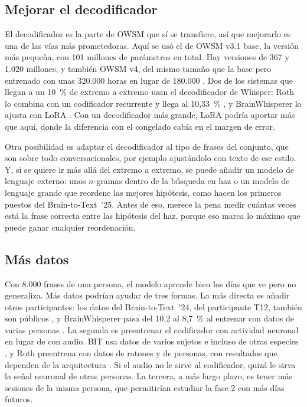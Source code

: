 \subsection{Mejorar el decodificador}

El decodificador es la parte de OWSM que sí se transfiere, así que mejorarlo es una de las vías más prometedoras. Aquí se usó el de OWSM v3.1 base, la versión más pequeña, con 101 millones de parámetros en total. Hay versiones de 367 y 1.020 millones, y también OWSM v4, del mismo tamaño que la base pero entrenado con unas 320.000 horas en lugar de 180.000 \cite{peng2025owsmv4}. Dos de los sistemas que llegan a un 10~\% de extremo a extremo usan el decodificador de Whisper: Roth lo combina con un codificador recurrente y llega al 10,33~\% \cite{roth2026}, y BrainWhisperer lo ajusta con LoRA \cite{brainwhisperer}. Con un decodificador más grande, LoRA podría aportar más que aquí, donde la diferencia con el congelado cabía en el margen de error.

Otra posibilidad es adaptar el decodificador al tipo de frases del conjunto, que son sobre todo conversacionales, por ejemplo ajustándolo con texto de ese estilo. Y, si se quiere ir más allá del extremo a extremo, se puede añadir un modelo de lenguaje externo: unos $n$-gramas dentro de la búsqueda en haz o un modelo de lenguaje grande que reordene las mejores hipótesis, como hacen los primeros puestos del Brain-to-Text~'25. Antes de eso, merece la pena medir cuántas veces está la frase correcta entre las hipótesis del haz, porque eso marca lo máximo que puede ganar cualquier reordenación.

\subsection{Más datos}

Con 8.000 frases de una persona, el modelo aprende bien los días que ve pero no generaliza. Más datos podrían ayudar de tres formas. La más directa es añadir otros participantes: los datos del Brain-to-Text~'24, del participante T12, también son públicos \cite{willett2023,b2t24lessons}, y BrainWhisperer pasa del 10,2 al 8,7~\% al entrenar con datos de varias personas \cite{brainwhisperer}. La segunda es preentrenar el codificador con actividad neuronal en lugar de con audio. BIT usa datos de varios sujetos e incluso de otras especies \cite{crossspecies2025}, y Roth preentrena con datos de ratones y de personas, con resultados que dependen de la arquitectura \cite{roth2026}. Si el audio no le sirve al codificador, quizá le sirva la señal neuronal de otras personas. La tercera, a más largo plazo, es tener más sesiones de la misma persona, que permitirían estudiar la fase 2 con más días futuros.

